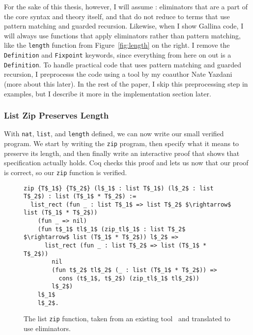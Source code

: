 For the sake of this thesis, however, I will assume : eliminators that are a part of the core syntax and theory itself,
and that do not reduce to terms that use pattern matching and guarded recursion.
Likewise, when I show Gallina code, I will always use functions that apply eliminators rather than pattern matching, like the \lstinline{length} function from Figure~\ref{fig:length}
on the right.
I remove the \lstinline{Definition} and \lstinline{Fixpoint} keywords, since everything from here on out is a \lstinline{Definition}.
To handle practical code that uses pattern matching and guarded recursion,
I preprocesss the code using a tool by my coauthor Nate Yazdani (more about this later). %
In the rest of the paper, I skip this preprocessing step in examples, but I describe it more in the implementation section later.

\subsubsection{List Zip Preserves Length}
\label{sec:verif}

With \lstinline{nat}, \lstinline{list}, and \lstinline{length} defined, we can now write our small verified program.
We start by writing the \lstinline{zip} program, then specify what it means to preserve its length, and then finally
write an interactive proof that shows that specification actually holds.
Coq checks this proof and lets us now that our proof is correct, so our \lstinline{zip} function is verified.

\begin{figure}
\begin{lstlisting}
zip {T$_1$} {T$_2$} (l$_1$ : list T$_1$) (l$_2$ : list T$_2$) : list (T$_1$ * T$_2$) :=
  list_rect (fun _ : list T$_1$ => list T$_2$ $\rightarrow$ list (T$_1$ * T$_2$))
    (fun _ => nil)
    (fun t$_1$ tl$_1$ (zip_tl$_1$ : list T$_2$ $\rightarrow$ list (T$_1$ * T$_2$)) l$_2$ =>
      list_rect (fun _ : list T$_2$ => list (T$_1$ * T$_2$))
        nil
        (fun t$_2$ tl$_2$ (_ : list (T$_1$ * T$_2$)) =>
          cons (t$_1$, t$_2$) (zip_tl$_1$ tl$_2$))
        l$_2$)
    l$_1$
    l$_2$.
\end{lstlisting}
\caption{The list \lstinline{zip} function, taken from an existing tool~\cite{TODO} %
and translated to use eliminators.}
\label{fig:zip}
\end{figure}

